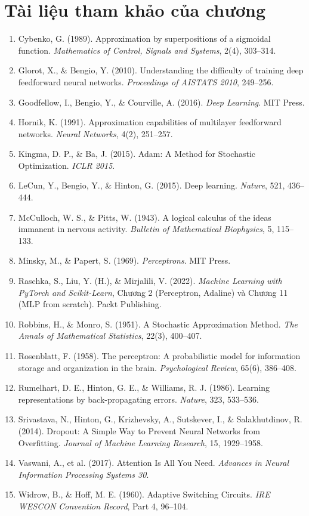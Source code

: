 \section*{Tài liệu tham khảo của chương}
\begin{enumerate}
    \item Cybenko, G. (1989). Approximation by superpositions of a sigmoidal function. \textit{Mathematics of Control, Signals and Systems}, 2(4), 303--314.
    \item Glorot, X., \& Bengio, Y. (2010). Understanding the difficulty of training deep feedforward neural networks. \textit{Proceedings of AISTATS 2010}, 249--256.
    \item Goodfellow, I., Bengio, Y., \& Courville, A. (2016). \textit{Deep Learning}. MIT Press.
    \item Hornik, K. (1991). Approximation capabilities of multilayer feedforward networks. \textit{Neural Networks}, 4(2), 251--257.
    \item Kingma, D. P., \& Ba, J. (2015). Adam: A Method for Stochastic Optimization. \textit{ICLR 2015}.
    \item LeCun, Y., Bengio, Y., \& Hinton, G. (2015). Deep learning. \textit{Nature}, 521, 436--444.
    \item McCulloch, W. S., \& Pitts, W. (1943). A logical calculus of the ideas immanent in nervous activity. \textit{Bulletin of Mathematical Biophysics}, 5, 115--133.
    \item Minsky, M., \& Papert, S. (1969). \textit{Perceptrons}. MIT Press.
    \item Raschka, S., Liu, Y. (H.), \& Mirjalili, V. (2022). \textit{Machine Learning with PyTorch and Scikit-Learn}, Chương 2 (Perceptron, Adaline) và Chương 11 (MLP from scratch). Packt Publishing.
    \item Robbins, H., \& Monro, S. (1951). A Stochastic Approximation Method. \textit{The Annals of Mathematical Statistics}, 22(3), 400--407.
    \item Rosenblatt, F. (1958). The perceptron: A probabilistic model for information storage and organization in the brain. \textit{Psychological Review}, 65(6), 386--408.
    \item Rumelhart, D. E., Hinton, G. E., \& Williams, R. J. (1986). Learning representations by back-propagating errors. \textit{Nature}, 323, 533--536.
    \item Srivastava, N., Hinton, G., Krizhevsky, A., Sutskever, I., \& Salakhutdinov, R. (2014). Dropout: A Simple Way to Prevent Neural Networks from Overfitting. \textit{Journal of Machine Learning Research}, 15, 1929--1958.
    \item Vaswani, A., et al. (2017). Attention Is All You Need. \textit{Advances in Neural Information Processing Systems 30}.
    \item Widrow, B., \& Hoff, M. E. (1960). Adaptive Switching Circuits. \textit{IRE WESCON Convention Record}, Part 4, 96--104.
\end{enumerate}
